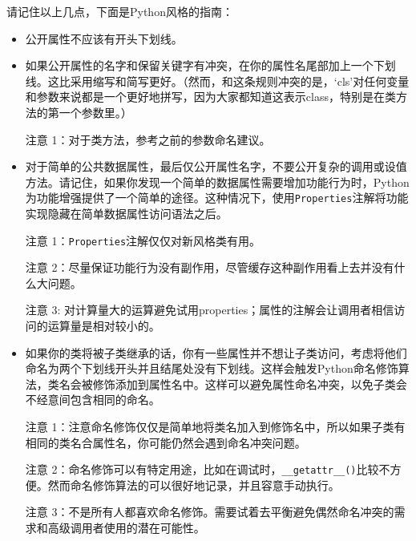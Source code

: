 \documentclass[ignorenonframetext,9pt]{beamer}
\begin{document}
\begin{frame}[fragile]

请记住以上几点，下面是Python风格的指南：

\begin{itemize}
\item
  公开属性不应该有开头下划线。
\item
  如果公开属性的名字和保留关键字有冲突，在你的属性名尾部加上一个下划线。这比采用缩写和简写更好。（然而，和这条规则冲突的是，`cls'对任何变量和参数来说都是一个更好地拼写，因为大家都知道这表示class，特别是在类方法的第一个参数里。）

  注意 1：对于类方法，参考之前的参数命名建议。

\end{itemize}
\end{frame}

\begin{frame}[fragile]
  
\begin{itemize}
\item
  对于简单的公共数据属性，最后仅公开属性名字，不要公开复杂的调用或设值方法。请记住，如果你发现一个简单的数据属性需要增加功能行为时，Python为功能增强提供了一个简单的途径。这种情况下，使用\texttt{Properties}注解将功能实现隐藏在简单数据属性访问语法之后。

  注意 1：\texttt{Properties}注解仅仅对新风格类有用。

  注意
  2：尽量保证功能行为没有副作用，尽管缓存这种副作用看上去并没有什么大问题。

  注意 3:
  对计算量大的运算避免试用properties；属性的注解会让调用者相信访问的运算量是相对较小的。
\end{itemize}

\end{frame}

\begin{frame}[fragile]

\begin{itemize}
\item
  如果你的类将被子类继承的话，你有一些属性并不想让子类访问，考虑将他们命名为两个下划线开头并且结尾处没有下划线。这样会触发Python命名修饰算法，类名会被修饰添加到属性名中。这样可以避免属性命名冲突，以免子类会不经意间包含相同的命名。

  注意
  1：注意命名修饰仅仅是简单地将类名加入到修饰名中，所以如果子类有相同的类名合属性名，你可能仍然会遇到命名冲突问题。

  注意
  2：命名修饰可以有特定用途，比如在调试时，\texttt{\_\_getattr\_\_()}比较不方便。然而命名修饰算法的可以很好地记录，并且容意手动执行。

  注意
  3：不是所有人都喜欢命名修饰。需要试着去平衡避免偶然命名冲突的需求和高级调用者使用的潜在可能性。
\end{itemize}

\end{frame}
\end{document}
